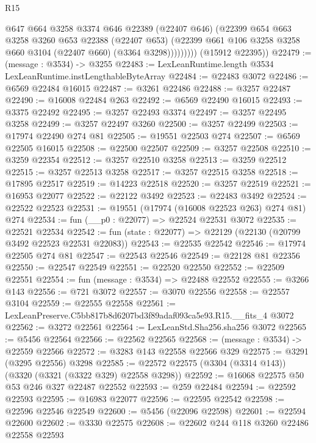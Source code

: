 \begin{lexlean}{R15}
\begin{coremodule}
                  @647
                  @664
                  @3258
                  @3374
                  @646
                  @22389
                  (@22407 @646)
                  (@22399
                    @654
                    @663
                    @3258
                    @3260
                    @653
                    @22388
                    (@22407 @653)
                    (@22399 @661 @106 @3258 @3258 @660 @3104 (@22407 @660) (@3364 @3298)))))))))
      (@15912 @22395))
@22479 := (message : @3534) -> @3255
@22483 := LexLeanRuntime.length @3534 LexLeanRuntime.instLengthableByteArray
@22484 := @22483 @3072
@22486 := @6569 @22484 @16015
@22487 := @3261 @22486
@22488 := @3257 @22487
@22490 := @16008 @22484 @263
@22492 := @6569 @22490 @16015
@22493 := @3375 @22492
@22495 := @3257 @22493 @3374
@22497 := @3257 @22495 @3258
@22499 := @3257 @22497 @3260
@22500 := @3257 @22499
@22503 := @17974 @22490 @274 @81
@22505 := @19551 @22503 @274
@22507 := @6569 @22505 @16015
@22508 := @22500 @22507
@22509 := @3257 @22508
@22510 := @3259 @22354
@22512 := @3257 @22510 @3258
@22513 := @3259 @22512
@22515 := @3257 @22513 @3258
@22517 := @3257 @22515 @3258
@22518 := @17895 @22517
@22519 := @14223 @22518
@22520 := @3257 @22519
@22521 := @16953 @22077
@22522 := @22122 @3492
@22523 := @22483 @3492
@22524 := @22522 @22523
@22531 := @19551 (@17974 (@16008 @22523 @263) @274 @81) @274
@22534 := fun (__p0 : @22077) => @22524 @22531 @3072
@22535 := @22521 @22534
@22542 := fun (state : @22077) => @22129 (@22130 (@20799 @3492 @22523 @22531 @22083))
@22543 := @22535 @22542
@22546 := @17974 @22505 @274 @81
@22547 := @22543 @22546
@22549 := @22128 @81 @22356
@22550 := @22547 @22549
@22551 := @22520 @22550
@22552 := @22509 @22551
@22554 := fun (message : @3534) => @22488 @22552
@22555 := @3266 @143
@22556 := @721 @3072
@22557 := @3070 @22556
@22558 := @22557 @3104
@22559 := @22555 @22558
@22561 := LexLeanPreserve.C5bb817b8d6207bd3f89adaf093ca5e93.R15.__fits_4 @3072
@22562 := @3272 @22561
@22564 := LexLeanStd.Sha256.sha256 @3072
@22565 := @5456 @22564
@22566 := @22562 @22565
@22568 := (message : @3534) -> @22559 @22566
@22572 := @3283 @143 @22558 @22566 @329
@22575 := @3291 (@3295 @22556) @3298
@22585 := @22572 @22575 (@3304 (@3314 @143)) (@3320 (@3321 (@3322 @329) @22558 @3298))
@22592 := @16068 @22575 @50 @53 @246 @327 @22487 @22552
@22593 := @259 @22484
@22594 := @22592 @22593
@22595 := @16983 @22077
@22596 := @22595 @22542
@22598 := @22596 @22546 @22549
@22600 := @5456 (@22096 @22598)
@22601 := @22594 @22600
@22602 := @3330 @22575
@22608 := @22602 @244 @118 @3260 @22486 @22558 @22593

\end{coremodule}
\end{lexlean}
